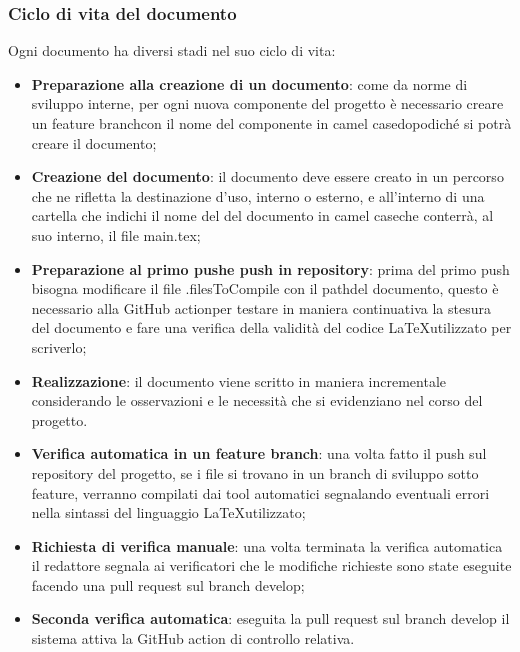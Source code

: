   \subsubsection{Ciclo di vita del documento}
  Ogni documento ha diversi stadi nel suo ciclo di vita:
  \begin{itemize}
    \item \textbf{Preparazione alla creazione di un documento}: come da norme di
    sviluppo interne, per ogni nuova componente del progetto \`e necessario creare un
    feature branch\glo con il nome del componente in camel case\glo dopodich\'e
    si potr\`a creare il documento;

    \item \textbf{Creazione del documento}: il documento deve essere creato in un
    percorso che ne rifletta la destinazione d'uso, interno o esterno, e
    all'interno di una cartella che indichi il nome del del documento in
    camel case\glo che conterr\`a, al suo interno, il file main.tex;

    \item \textbf{Preparazione al primo push\glo e push in repository\glo}: prima del primo
     push bisogna modificare il file .filesToCompile con il path\glo del documento,
     questo \`e necessario alla GitHub action\glo per testare in maniera continuativa
     la stesura del documento e fare una verifica della validit\`a del codice
     \LaTeX \space utilizzato per scriverlo;

    \item \textbf{Realizzazione}: il documento viene scritto in maniera incrementale
    considerando le osservazioni e le necessit\`a che si evidenziano nel corso del
    progetto.

    \item \textbf{Verifica automatica in un feature branch}: una volta fatto il push
    sul repository del progetto, se i file si trovano in un branch di sviluppo
    sotto feature, verranno compilati dai tool automatici segnalando eventuali errori
    nella sintassi del linguaggio \LaTeX \space utilizzato;

    \item \textbf{Richiesta di verifica manuale}: una volta terminata la verifica
    automatica il redattore segnala ai verificatori che le modifiche richieste
    sono state eseguite facendo una pull request sul branch develop;

    \item \textbf{Seconda verifica automatica}: eseguita la pull request sul branch
    develop il sistema attiva la GitHub action di controllo relativa.


\end{itemize}
